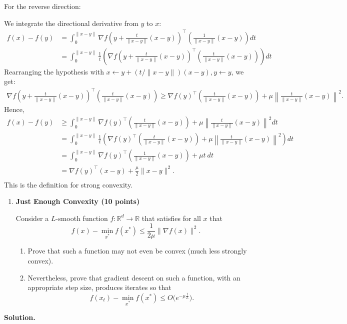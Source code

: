 \documentclass[11pt,letterpaper]{article}
\theoremstyle{definition}
\newcommand{\reals}{\mathbb{R}}
\newcommand{\solution}{\medskip\noindent\textbf{Solution.}\par\medskip}
\begin{document}
For the reverse direction:

We integrate the directional derivative from $y$ to $x$:
\begin{align*}
    f(x) - f(y) &= \int_{0}^{\|x-y\|}\nabla f(y+\frac{t}{\|x-y\|}(x-y))^\top(\frac{1}{\|x-y\|}(x-y))dt \\
    &= \int_{0}^{\|x-y\|}\frac{1}{t}\left(\nabla f(y+\frac{t}{\|x-y\|}(x-y))^\top(\frac{t}{\|x-y\|}(x-y)) \right)dt
\end{align*}
Rearranging the hypothesis with $x\gets y+(t/\|x-y\|) (x-y), y\gets y$, we get:
\begin{align*}
    \nabla f(y+\frac{t}{\|x-y\|}(x-y))^\top(\frac{t}{\|x-y\|}(x-y)) \geq \nabla f(y)^\top(\frac{t}{\|x-y\|}(x-y)) + \mu\left\|\frac{t}{\|x-y\|}(x-y)\right\|^2.
\end{align*}
Hence, 
\begin{align*}
    f(x) - f(y) &\geq \int_{0}^{\|x-y\|} \nabla f(y)^\top(\frac{t}{\|x-y\|}(x-y)) + \mu\left\|\frac{t}{\|x-y\|}(x-y)\right\|^2 dt \\
    & = \int_{0}^{\|x-y\|} \frac{1}{t}\left(\nabla f(y)^\top(\frac{t}{\|x-y\|}(x-y)) + \mu\left\|\frac{t}{\|x-y\|}(x-y)\right\|^2 \right)dt \\
    & = \int_{0}^{\|x-y\|} \nabla f(y)^\top(\frac{1}{\|x-y\|}(x-y)) + \mu t \ dt \\
    & = \nabla f(y)^\top(x-y) + \frac{\mu}{2} \|x-y\|^2 .\\
\end{align*}
This is the definition for strong convexity.


\begin{enumerate}[resume=q]
\item \textbf{Just Enough Convexity (10 points)}

Consider a $L$-smooth function $f : \reals^d \to \reals$ that satisfies for all $x$ that
\[
f(x) - \min_{x^*} f(x^*) \leq \frac{1}{2\mu}\|\nabla f(x)\|^2.
\]
\begin{enumerate}[label=\textbf{Part \Alph*.}, leftmargin=*]
\item Prove that such a function may not even be convex (much less strongly convex).
\item Nevertheless, prove that gradient descent on such a function, with an appropriate step size, produces iterates so that
\[
f(x_t) - \min_{x^*} f(x^*) \leq O\bigl(e^{-\mu \frac{t}{L}}\bigr).
\]
\end{enumerate}
\end{enumerate}

\solution
\end{document}
